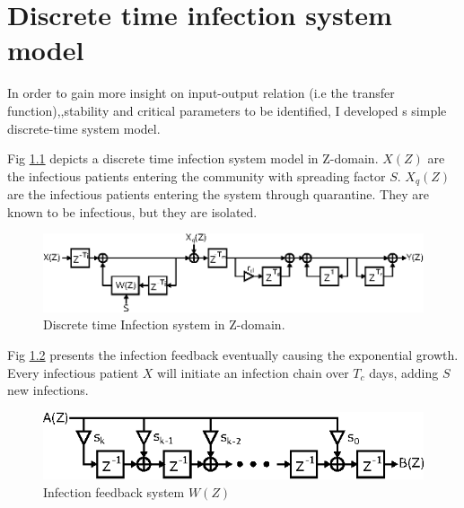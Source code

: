 \chapter{Discrete time infection system model}\label{sect:discrete_time}
In order to gain more insight on input-output relation (i.e the
transfer function),,stability and critical parameters to be identified, I
developed s simple discrete-time system model.

Fig \ref{fig:infection_system} depicts a discrete time infection system model
in Z-domain. $X(Z)$ are 
    the infectious patients entering the community with spreading factor $S$.
$X_q(Z)$ are the infectious patients entering the system through
quarantine. They are known to be infectious, but they are isolated.
\begin{figure}
    \centering
    \includegraphics[width=\textwidth]{Figures/Infection_system.eps}
    \caption{Discrete time Infection system in Z-domain.}\label{fig:infection_system}
\end{figure}

Fig \ref{fig:infection_feedback_system} presents the infection feedback
eventually causing the exponential growth. Every infectious patient $X$ will
initiate an infection chain over $T_c$ days, adding $S$ new infections. 
\begin{figure}
    \centering
    \includegraphics[width=\textwidth]{Figures/Contamination_feedback_system.eps}
    \caption{Infection feedback system $W(Z)$}\label{fig:infection_feedback_system}
\end{figure}

